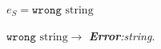 \begin{case}
$e_{S}=\mathtt{wrong}$ $\mathrm{string}$

$\mathtt{wrong}$ $\mathrm{string}\rightarrow$ \emph{\textbf{Error}:\;string}.
\end{case}